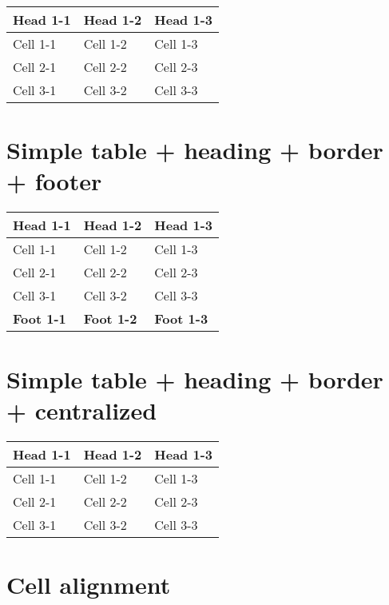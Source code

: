 \documentclass{article}
\begin{document}
\begin{center}\begin{tabular}{|l|l|l|}
\hline \textbf{Head 1-1} & \textbf{Head 1-2} & \textbf{Head 1-3} \\
\hline Cell 1-1 & Cell 1-2 & Cell 1-3 \\
\hline Cell 2-1 & Cell 2-2 & Cell 2-3 \\
\hline Cell 3-1 & Cell 3-2 & Cell 3-3 \\
\hline \end{tabular}\end{center}

\section*{Simple table + heading + border + footer}

\begin{center}\begin{tabular}{|l|l|l|}
\hline \textbf{Head 1-1} & \textbf{Head 1-2} & \textbf{Head 1-3} \\
\hline Cell 1-1 & Cell 1-2 & Cell 1-3 \\
\hline Cell 2-1 & Cell 2-2 & Cell 2-3 \\
\hline Cell 3-1 & Cell 3-2 & Cell 3-3 \\
\hline \textbf{Foot 1-1} & \textbf{Foot 1-2} & \textbf{Foot 1-3} \\
\hline \end{tabular}\end{center}

\section*{Simple table + heading + border + centralized}

\begin{center}\begin{tabular}{|l|l|l|}
\hline \textbf{Head 1-1} & \textbf{Head 1-2} & \textbf{Head 1-3} \\
\hline Cell 1-1 & Cell 1-2 & Cell 1-3 \\
\hline Cell 2-1 & Cell 2-2 & Cell 2-3 \\
\hline Cell 3-1 & Cell 3-2 & Cell 3-3 \\
\hline \end{tabular}\end{center}

\section*{Cell alignment}
\end{document}
